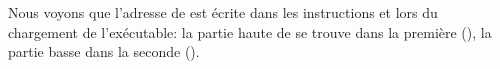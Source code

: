 Nous voyons que l'adresse de  est écrite dans les instructions 
et  lors du chargement de l'exécutable:
la partie haute de  se trouve dans la première (), la partie
basse dans la seconde ().

